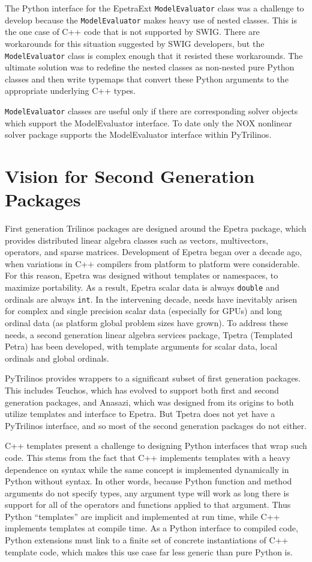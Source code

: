\documentclass[11pt]{article}
\begin{document}
The Python interface for the EpetraExt {\tt ModelEvaluator} class was a challenge to develop because the {\tt ModelEvaluator} makes heavy use of nested classes.  This is the one case of C++ code that is not supported by SWIG.  There are workarounds for this situation suggested by SWIG developers, but the {\tt ModelEvaluator} class is complex enough that it resisted these workarounds.  The ultimate solution was to redefine the nested classes as non-nested pure Python classes and then write typemaps that convert these Python arguments to the appropriate underlying C++ types.

{\tt ModelEvaluator} classes are useful only if there are corresponding solver objects which support the ModelEvaluator interface.  To date only the NOX nonlinear solver package supports the ModelEvaluator interface within PyTrilinos.

\section{Vision for Second Generation Packages}
\label{sec:vision}

First generation Trilinos packages are designed around the Epetra package, which provides distributed linear algebra classes such as vectors, multivectors, operators, and sparse matrices.  Development of Epetra began over a decade ago, when variations in C++ compilers from platform to platform were considerable.  For this reason, Epetra was designed without templates or namespaces, to maximize portability.  As a result, Epetra scalar data is always {\tt double} and ordinals are always {\tt int}.  In the intervening decade, needs have inevitably arisen for complex and single precision scalar data (especially for GPUs) and long ordinal data (as platform global problem sizes have grown).  To address these needs, a second generation linear algebra services package, Tpetra (Templated Petra) has been developed, with template arguments for scalar data, local ordinals and global ordinals.

PyTrilinos provides wrappers to a significant subset of first generation packages.  This includes Teuchos, which has evolved to support both first and second generation packages, and Anasazi, which was designed from its origins to both utilize templates and interface to Epetra.  But Tpetra does not yet have a PyTrilinos interface, and so most of the second generation packages do not either.

C++ templates present a challenge to designing Python interfaces that wrap such code.  This stems from the fact that C++ implements templates with a heavy dependence on syntax while the same concept is implemented dynamically in Python without syntax.  In other words, because Python function and method arguments do not specify types, any argument type will work as long there is support for all of the operators and functions applied to that argument.  Thus Python ``templates'' are implicit and implemented at run time, while C++ implements templates at compile time.  As a Python interface to compiled code, Python extensions must link to a finite set of concrete instantiations of C++ template code, which makes this use case far less generic than pure Python is.
\end{document}

